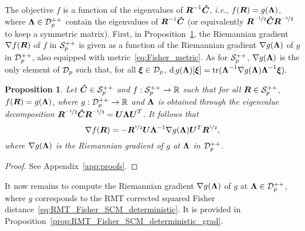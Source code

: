 \documentclass{article}
\theoremstyle{plain}
\newtheorem{proposition}[theorem]{Proposition}
\theoremstyle{definition}
\theoremstyle{remark}
\begin{document}
The objective $f$ is a function of the eigenvalues of $\boldsymbol{R}^{-1}\boldsymbol{\hat{C}}$, \emph{i.e.}, $f(\boldsymbol{R})=g(\boldsymbol{\Lambda})$, where $\boldsymbol{\Lambda}\in\mathcal{D}^{++}_{p}$ contain the eigenvalues of $\boldsymbol{R}^{-1}\boldsymbol{\hat{C}}$ (or equivalently $\boldsymbol{R}^{\nicefrac{-1}{2}}\boldsymbol{\hat{C}}\boldsymbol{R}^{\nicefrac{-1}{2}}$ to keep a symmetric matrix).
First, in Proposition~\ref{prop:Rgrad_eigsfun}, the Riemannian gradient $\nabla f(\boldsymbol{R})$ of $f$ in $\mathcal{S}^{++}_{p}$ is given as a function of the Riemannian gradient $\nabla g(\boldsymbol{\Lambda})$ of $g$ in $\mathcal{D}^{++}_{p}$, also equipped with metric~\eqref{eq:Fisher_metric}.
As for $\mathcal{S}^{++}_{p}$, $\nabla g(\boldsymbol{\Lambda})$ is the only element of $\mathcal{D}_{p}$ such that, for all $\boldsymbol{\xi}\in\mathcal{D}_{p}$,
    $\operatorname{d} g(\boldsymbol{\Lambda})[\boldsymbol{\xi}] = \operatorname{tr}(\boldsymbol{\Lambda}^{-1}\nabla g(\boldsymbol{\Lambda})\boldsymbol{\Lambda}^{-1}\boldsymbol{\xi}).$
%
\begin{proposition}
\label{prop:Rgrad_eigsfun}
    Let $\boldsymbol{\hat{C}}\in\mathcal{S}^{++}_{p}$ and $f:\mathcal{S}^{++}_{p}\to\mathbb{R}$ such that for all $\boldsymbol{R}\in\mathcal{S}^{++}_{p}$, $f(\boldsymbol{R})=g(\boldsymbol{\Lambda})$, where $g:\mathcal{D}^{++}_{p}\to\mathbb{R}$ and $\boldsymbol{\Lambda}$ is obtained through the eigenvalue decomposition $\boldsymbol{R}^{\nicefrac{-1}{2}}\boldsymbol{\hat{C}}\boldsymbol{R}^{\nicefrac{-1}{2}}=\boldsymbol{U}\boldsymbol{\Lambda}\boldsymbol{U}^T$.
    It follows that
    \begin{equation*}
        \nabla f(\boldsymbol{R}) = -\boldsymbol{R}^{\nicefrac12}\boldsymbol{U}\boldsymbol{\Lambda}^{-1}\nabla g(\boldsymbol{\Lambda})\boldsymbol{U}^T\boldsymbol{R}^{\nicefrac12},
    \end{equation*}
    where $\nabla g(\boldsymbol{\Lambda})$ is the Riemannian gradient of $g$ at $\boldsymbol{\Lambda}$ in $\mathcal{D}^{++}_{p}$.
\end{proposition}
\begin{proof}
    See Appendix~\ref{app:proofs}.
\end{proof}
%
It now remains to compute the Riemannian gradient $\nabla g(\boldsymbol{\Lambda})$ of $g$ at $\boldsymbol{\Lambda}\in\mathcal{D}^{++}_{p}$, where $g$ corresponds to the RMT corrected squared Fisher distance~\eqref{eq:RMT_Fisher_SCM_deterministic}.
It is provided in Proposition~\ref{prop:RMT_Fisher_SCM_deterministic_grad}.
%
\end{document}
